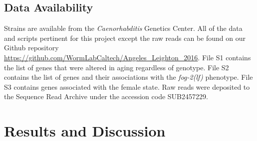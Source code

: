 \documentclass[9pt,twocolumn,twoside]{gsag3jnl}
\newcommand{\fog}{\emph{\mbox{fog-2(lf)}}}
\begin{document}
\subsection*{Data Availability}
\label{sb:data_availability}
Strains are available from the \emph{Caenorhabditis} Genetics Center. All of the
data and scripts pertinent for this project except the raw reads can be found on
our Github repository
\url{https://github.com/WormLabCaltech/Angeles_Leighton_2016}. File S1
contains the list of genes that were altered in aging regardless of genotype.
File S2 contains the list of genes and their associations with the \fog{}
phenotype. File S3 contains genes associated with the female state. Raw reads
were deposited to the Sequence Read Archive under the accession code SUB2457229.

\section{Results and Discussion}
\end{document}
